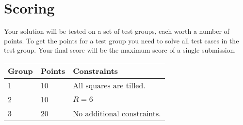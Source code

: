 \section*{Scoring}
Your solution will be tested on a set of test groups, each worth a number of points.
To get the points for a test group you need to solve all test cases in the test group.
Your final score will be the maximum score of a single submission.

\noindent
\begin{tabular}{| l | l | l |}
\hline
Group & Points & Constraints \\ \hline
1      & 10     & All squares are tilled. \\ \hline
2      & 10     & $R = 6$ \\ \hline
3      & 20     & No additional constraints. \\ \hline
\end{tabular}

